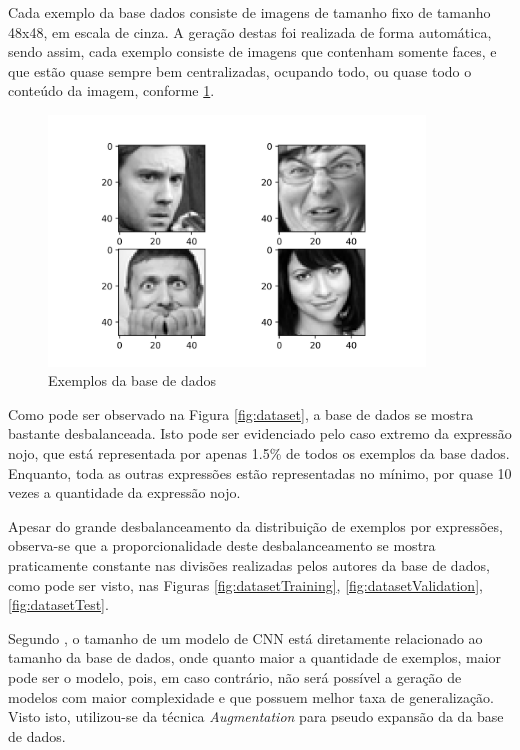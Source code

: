 Cada exemplo da base dados consiste de imagens de tamanho fixo de tamanho 48x48, em escala de cinza. A geração destas foi realizada de forma automática, sendo assim, cada exemplo consiste de imagens que contenham somente faces, e que estão quase sempre bem centralizadas, ocupando todo, ou quase todo o conteúdo da imagem, conforme \ref{fig:samples}. 

\begin{figure}[!htb]
    \centering
    \includegraphics[width=10cm]{images/samples.png}
    \caption{Exemplos da base de dados}
    \label{fig:samples}
\end{figure}

Como pode ser observado na Figura \ref{fig:dataset}, a base de dados se mostra bastante desbalanceada. Isto pode ser evidenciado pelo caso extremo da expressão nojo, que está representada por apenas 1.5\% de todos os exemplos da base dados. Enquanto, toda as outras expressões estão representadas no mínimo, por quase 10 vezes a quantidade da expressão nojo.

Apesar do grande desbalanceamento da distribuição de exemplos por expressões, observa-se que a proporcionalidade deste desbalanceamento se mostra praticamente constante nas divisões realizadas pelos autores da base de dados, como pode ser visto, nas Figuras \ref{fig:datasetTraining}, \ref{fig:datasetValidation}, \ref{fig:datasetTest}.

Segundo \cite{}, o tamanho de um modelo de CNN está diretamente relacionado ao tamanho da base de dados, onde quanto maior a quantidade de exemplos, maior pode ser o modelo, pois, em caso contrário, não será possível a geração de modelos com maior complexidade e que possuem melhor taxa de generalização. Visto isto, utilizou-se da técnica \emph{Augmentation} para pseudo expansão da da base de dados.